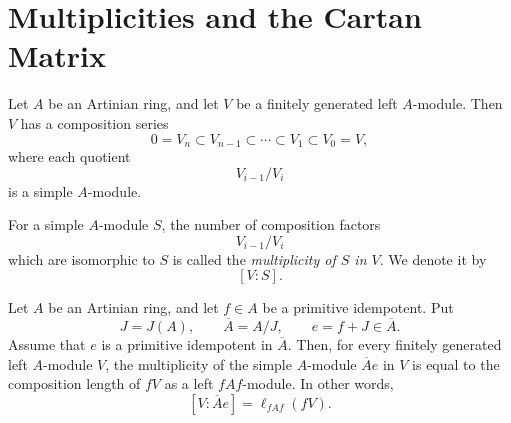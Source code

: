\section{Multiplicities and the Cartan Matrix}

\begin{definition}
    Let \(A\) be an Artinian ring, and let \(V\) be a finitely generated left \(A\)-module.
    Then \(V\) has a composition series
    \[
        0=V_n \subset V_{n-1} \subset \cdots \subset V_1 \subset V_0=V,
    \]
    where each quotient
    \[
        V_{i-1}/V_i
    \]
    is a simple \(A\)-module.

    For a simple \(A\)-module \(S\), the number of composition factors
    \[
        V_{i-1}/V_i
    \]
    which are isomorphic to \(S\) is called the \emph{multiplicity of \(S\) in \(V\)}.
    We denote it by
    \[
        [V:S].
    \]
\end{definition}

\begin{theorem}
    Let \(A\) be an Artinian ring, and let \(f\in A\) be a primitive idempotent. Put
    \[
        J=J(A),\qquad \overline{A}=A/J,
        \qquad e=f+J\in \overline{A}.
    \]
    Assume that \(e\) is a primitive idempotent in \(\overline{A}\). Then, for every finitely
    generated left \(A\)-module \(V\), the multiplicity of the simple \(A\)-module
    \(\overline{A}e\) in \(V\) is equal to the composition length of \(fV\) as a left
    \(fAf\)-module. In other words,
    \[
        [V:\overline{A}e]=\ell_{fAf}(fV).
    \]
\end{theorem}

